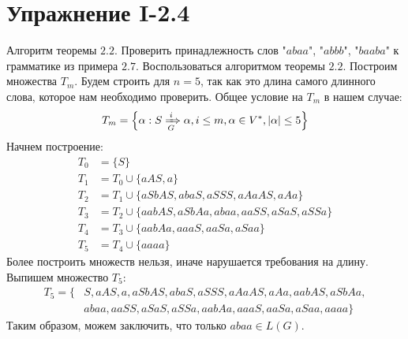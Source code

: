\documentclass[12pt, oneside]{memoir}
\begin{document}


\section*{Упражнение I-2.4}
\begin{solution}
    {Алгоритм теоремы $2.2$.}
    {Проверить принадлежность слов "$abaa$", "$abbb$", "$baaba$" к грамматике из примера $2.7$.}
    {Воспользоваться алгоритмом теоремы $2.2$.}
    Построим множества $T_m$.
    Будем строить для $n = 5$, так как это длина самого длинного слова, которое нам необходимо проверить.
    Общее условие на $T_m$ в нашем случае:
    \[T_m = \left\{\alpha : S \xRightarrow[G]{i} \alpha, i \le m, \alpha \in V^*, |\alpha| \le 5\right\}\]
    Начнем построение:
    \begin{align*}
        T_0 & = \{S\}                                             \\
        T_1 & = T_0 \cup \{aAS, a\}                               \\
        T_2 & = T_1 \cup \{aSbAS, abaS, aSSS, aAaAS, aAa\}        \\
        T_3 & = T_2 \cup \{aabAS, aSbAa, abaa, aaSS, aSaS, aSSa\} \\
        T_4 & = T_3 \cup \{aabAa, aaaS, aaSa, aSaa\}              \\
        T_5 & = T_4 \cup \{aaaa\}
    \end{align*}
    Более построить множеств нельзя, иначе нарушается требования на длину.
    Выпишем множество $T_5$:
    \begin{align*}
        T_5 = \{ & S, aAS, a, aSbAS, abaS, aSSS, aAaAS, aAa, aabAS, aSbAa,  \\
                 & abaa, aaSS, aSaS, aSSa,aabAa, aaaS, aaSa, aSaa, aaaa  \}
    \end{align*}
    Таким образом, можем заключить, что только $abaa \in L(G)$.
\end{solution}
\end{document}
